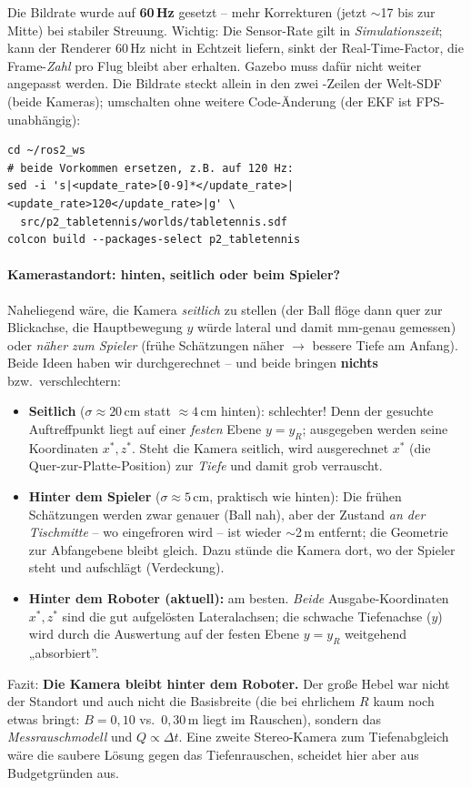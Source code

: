 \noindent Die Bildrate wurde auf \textbf{60\,Hz} gesetzt -- mehr Korrekturen
(jetzt $\sim$17 bis zur Mitte) bei stabiler Streuung. Wichtig: Die
Sensor-Rate gilt in \emph{Simulationszeit}; kann der Renderer 60\,Hz nicht in
Echtzeit liefern, sinkt der Real-Time-Factor, die Frame-\emph{Zahl} pro
Flug bleibt aber erhalten. Gazebo muss dafür nicht weiter angepasst werden. Die
Bildrate steckt allein in den zwei -Zeilen der Welt-SDF
(beide Kameras); umschalten ohne weitere Code-Änderung (der EKF ist
FPS-unabhängig):
\begin{lstlisting}[style=bash,caption={FPS umschalten (30 / 60 / 120 Hz)}]
cd ~/ros2_ws
# beide Vorkommen ersetzen, z.B. auf 120 Hz:
sed -i 's|<update_rate>[0-9]*</update_rate>|<update_rate>120</update_rate>|g' \
  src/p2_tabletennis/worlds/tabletennis.sdf
colcon build --packages-select p2_tabletennis
\end{lstlisting}

\paragraph{Kamerastandort: hinten, seitlich oder beim Spieler?} Naheliegend wäre,
die Kamera \emph{seitlich} zu stellen (der Ball flöge dann quer zur Blickachse,
die Hauptbewegung $y$ würde lateral und damit mm-genau gemessen) oder \emph{näher
zum Spieler} (frühe Schätzungen näher $\rightarrow$ bessere Tiefe am Anfang). Beide
Ideen haben wir durchgerechnet -- und beide bringen \textbf{nichts} bzw.\
verschlechtern:
\begin{itemize}
\item \textbf{Seitlich} ($\sigma\approx20\,$cm statt $\approx4\,$cm hinten):
  schlechter! Denn der gesuchte Auftreffpunkt liegt auf einer \emph{festen}
  Ebene $y=y_R$; ausgegeben werden seine Koordinaten $x^\ast,z^\ast$. Steht die
  Kamera seitlich, wird ausgerechnet $x^\ast$ (die Quer-zur-Platte-Position) zur
  \emph{Tiefe} und damit grob verrauscht.
\item \textbf{Hinter dem Spieler} ($\sigma\approx5\,$cm, praktisch wie hinten):
  Die frühen Schätzungen werden zwar genauer (Ball nah), aber der Zustand
  \emph{an der Tischmitte} -- wo eingefroren wird -- ist wieder $\sim$2\,m
  entfernt; die Geometrie zur Abfangebene bleibt gleich. Dazu stünde die Kamera
  dort, wo der Spieler steht und aufschlägt (Verdeckung).
\item \textbf{Hinter dem Roboter (aktuell):} am besten. \emph{Beide}
  Ausgabe-Koordinaten $x^\ast,z^\ast$ sind die gut aufgelösten Lateralachsen; die
  schwache Tiefenachse ($y$) wird durch die Auswertung auf der festen Ebene
  $y=y_R$ weitgehend „absorbiert''.
\end{itemize}
\noindent Fazit: \textbf{Die Kamera bleibt hinter dem Roboter.} Der große Hebel war
nicht der Standort und auch nicht die Basisbreite (die bei ehrlichem $R$ kaum noch
etwas bringt: $B{=}0{,}10$ vs.\ $0{,}30\,$m liegt im Rauschen), sondern das
\emph{Messrauschmodell} und $Q\propto\Delta t$. Eine zweite Stereo-Kamera zum
Tiefenabgleich wäre die saubere Lösung gegen das Tiefenrauschen, scheidet hier
aber aus Budgetgründen aus.

